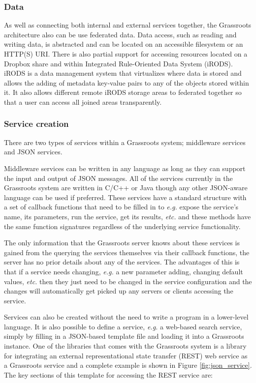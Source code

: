 \documentclass[9pt,a4paper]{extarticle}
\begin{document}
\subsubsection*{Data}

As well as connecting both internal and external services together, the Grassroots architecture also can be use federated data. Data access, such as reading and writing data, is abstracted and can be located on an accessible filesystem or an HTTP(S) URI. 
There is also partial support for accessing resources located on a Dropbox\cite{Dropbox} share and within Integrated Rule-Oriented Data System (iRODS)\cite{2007AGUFMIN13B1214R}. iRODS is a data management system that virtualizes where data is stored and allows the adding of metadata key-value pairs to any of the objects stored within it. It also allows different remote iRODS storage areas to federated together so that a user can access all joined areas transparently.


\subsubsection*{Service creation}

There are two types of services within a Grassroots system; middleware services and JSON services.

Middleware services can be written in any language as long as they can support the input and output of JSON messages. All of the services currently in the Grassroots system are written in C/C++ or Java though any other JSON-aware language can be used if preferred. These services have a standard structure with a set of callback functions that need to be filled in to \textit{e.g.} expose the service's name, its parameters, run the service, get its results, \textit{etc.} and these methods have the same function signatures regardless of the underlying service functionality. 

The only information that the Grassroots server knows about these services is gained from the querying the services themselves via their callback functions, the server has no prior details about any of the services. The advantages of this is that if a service needs changing, \textit{e.g.} a new parameter adding, changing default values, \textit{etc.} then they just need to be changed in the service configuration and the changes will automatically get picked up any servers or clients accessing the service. 

Services can also be created without the need to write a program in a lower-level language. It is also possible to define a service, \textit{e.g.} a web-based search service, simply by filling in a JSON-based template file and loading it into a Grassroots instance. 
One of the libraries that comes with the Grassroots system is a library for integrating an external representational state transfer (REST) web service as a Grassroots service and a complete example is shown in Figure \ref{fig:json_service}. The key sections of this template for accessing the REST service are:
\end{document}
